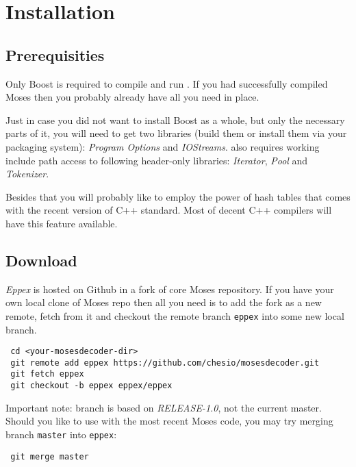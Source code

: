 \appendix
\chapter{Installation}
\label{chap:installation}


\section*{Prerequisities}

Only Boost is required to compile and run \eppex{}.
If you had successfully compiled Moses then you probably already have all you need in place.

Just in case you did not want to install Boost as a whole, but only the necessary
parts of it, you will need to get two libraries (build them or install
them via your packaging system): \emph{Program Options} and \emph{IOStreams}.
\Eppex{} also requires working include path access to following
header-only libraries: \emph{Iterator}, \emph{Pool} and \emph{Tokenizer}.

Besides that you will probably like to employ the power of hash tables
that comes with the recent version of C++ standard.
Most of decent C++ compilers will have this feature available.

\section*{Download}

\emph{Eppex} is hosted on Github in
a fork
of core Moses repository.
If you have your own local clone of Moses repo then all you need is to add
the fork as a new remote, fetch from it and checkout the remote branch
\texttt{eppex} into some new local branch.
\begin{verbatim}
 cd <your-mosesdecoder-dir>
 git remote add eppex https://github.com/chesio/mosesdecoder.git
 git fetch eppex
 git checkout -b eppex eppex/eppex
\end{verbatim}

Important note: \eppex{} branch is based on \emph{RELEASE-1.0},
not the current master. Should you like to use \eppex{} with the most
recent Moses code, you may try merging branch \texttt{master} into \texttt{eppex}:
\begin{verbatim}
 git merge master
\end{verbatim}

